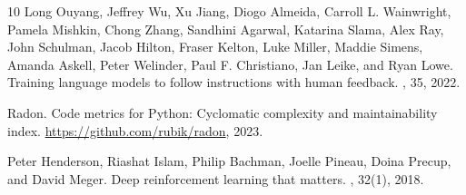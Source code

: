 \documentclass[sigconf,nonacm]{acmart}
\begin{document}
\begin{thebibliography}{10}
Long Ouyang, Jeffrey Wu, Xu Jiang, Diogo Almeida, Carroll L. Wainwright, Pamela Mishkin, Chong Zhang, Sandhini Agarwal, Katarina Slama, Alex Ray, John Schulman, Jacob Hilton, Fraser Kelton, Luke Miller, Maddie Simens, Amanda Askell, Peter Welinder, Paul F. Christiano, Jan Leike, and Ryan Lowe.
\newblock Training language models to follow instructions with human feedback.
, 35, 2022.

Radon.
\newblock Code metrics for Python: Cyclomatic complexity and maintainability index.
\newblock \url{https://github.com/rubik/radon}, 2023.

Peter Henderson, Riashat Islam, Philip Bachman, Joelle Pineau, Doina Precup, and David Meger.
\newblock Deep reinforcement learning that matters.
, 32(1), 2018.

\end{thebibliography}
\end{document}
